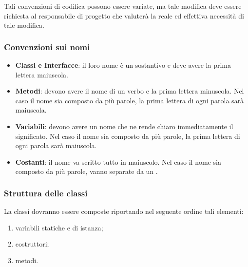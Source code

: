 {Tali convenzioni di codifica possono essere variate, ma tale modifica deve essere richiesta al responsabile di progetto che valuterà la reale ed effettiva necessità di tale modifica.

\subsubsection{Convenzioni sui nomi}
\begin{itemize}
\item \textbf{Classi e Interfacce}: il loro nome è un sostantivo e deve avere la prima lettera maiuscola.
\item \textbf{Metodi}: devono avere il nome di un verbo e la prima lettera minuscola. Nel caso il nome sia composto da più parole, la prima lettera di ogni parola sarà maiuscola.
\item \textbf{Variabili}: devono avere un nome che ne rende chiaro immediatamente il significato. Nel caso il nome sia composto da più parole, la prima lettera di ogni parola sarà maiuscola.
\item \textbf{Costanti}: il nome va scritto tutto in maiuscolo. Nel caso il nome sia composto da più parole, vanno separate da un .

\end{itemize}

\subsubsection{Struttura delle classi}
La classi dovranno essere composte riportando nel seguente ordine tali elementi:
\begin{enumerate}
\item variabili statiche e di istanza;
\item costruttori;
\item metodi.
\end{enumerate}

}
